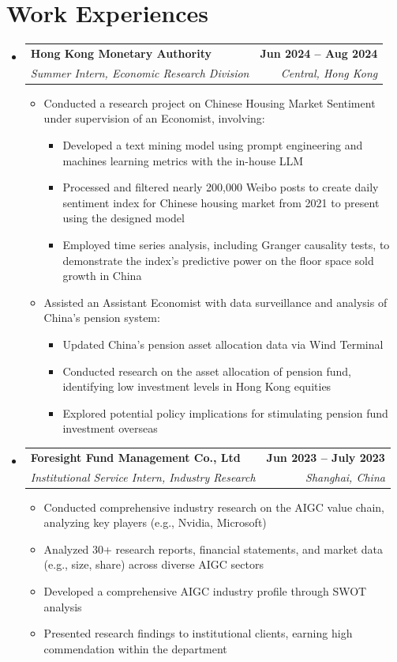 \documentclass[letterpaper,11pt]{article}
\newcommand{\resumeItem}[1]{
  \item\small{
    {#1 \vspace{-2pt}}
  }
}
\newcommand{\resumeSubheading}[4]{
  \vspace{-2pt}\item
    \begin{tabularx}{\textwidth}[t]{>{\raggedright\arraybackslash}X r} %
      \textbf{#1} & \textbf{\small #2} \\
      \textit{\small#3} & \textit{\small #4} \\
    \end{tabularx}\vspace{-7pt} %
}
\newcommand{\resumeSubHeadingListStart}{\begin{itemize}[leftmargin=0.0in, label={}]}
\newcommand{\resumeSubHeadingListEnd}{\end{itemize}}
\newcommand{\resumeItemListStart}{\begin{itemize}}
\newcommand{\resumeItemListEnd}{\end{itemize}\vspace{-5pt}}
\begin{document}
\section{Work Experiences}
    \resumeSubHeadingListStart
        \resumeSubheading
            {Hong Kong Monetary Authority}{Jun 2024 -- Aug 2024}
            {Summer Intern, Economic Research Division}{Central, Hong Kong}
            \resumeItemListStart
                \resumeItem{Conducted a research project on Chinese Housing Market Sentiment under supervision of an Economist, involving:}
                \begin{itemize}[label=$\circ$]
                    \item Developed a text mining model using prompt engineering and machines learning metrics with the in-house LLM
                    \item Processed and filtered nearly 200,000 Weibo posts to create daily sentiment index for Chinese housing market from 2021 to present using the designed model
                    \item Employed time series analysis, including Granger causality tests, to demonstrate the index’s predictive power on the floor space sold growth in China 
                \end{itemize}
                \resumeItem{Assisted an Assistant Economist with data surveillance and analysis of China’s pension system:}
                \begin{itemize}[label=$\circ$]
                    \item Updated China's pension asset allocation data via Wind Terminal
                    \item Conducted research on the asset allocation of pension fund, identifying low investment levels in Hong Kong equities
                    \item Explored potential policy implications for stimulating pension fund investment overseas
                \end{itemize}
            \resumeItemListEnd
        \resumeSubheading
            {Foresight Fund Management Co., Ltd}{Jun 2023 -- July 2023}
            {Institutional Service Intern, Industry Research}{Shanghai, China}
            \resumeItemListStart
                \resumeItem{Conducted comprehensive industry research on the AIGC value chain, analyzing key players (e.g., Nvidia, Microsoft)}
                \resumeItem{Analyzed 30+ research reports, financial statements, and market data (e.g., size, share) across diverse AIGC sectors}
                \resumeItem{Developed a comprehensive AIGC industry profile through SWOT analysis}
                \resumeItem{Presented research findings to institutional clients, earning high commendation within the department}
            \resumeItemListEnd
    \resumeSubHeadingListEnd
\vspace{-16pt}
\end{document}
